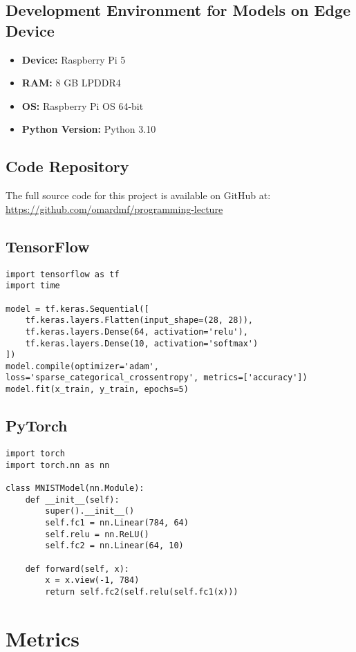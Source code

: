 \documentclass[a4paper,12pt]{article}
\begin{document}
\subsection*{Development Environment for Models on Edge Device}
\begin{itemize}
    \item \textbf{Device:} Raspberry Pi 5
    \item \textbf{RAM:} 8 GB LPDDR4
    \item \textbf{OS:} Raspberry Pi OS 64-bit
    \item \textbf{Python Version:} Python 3.10
\end{itemize}

\subsection{Code Repository}

The full source code for this project is available on GitHub at:  
\url{https://github.com/omardmf/programming-lecture}

\subsection{TensorFlow}
\begin{lstlisting}
import tensorflow as tf
import time

model = tf.keras.Sequential([
    tf.keras.layers.Flatten(input_shape=(28, 28)),
    tf.keras.layers.Dense(64, activation='relu'),
    tf.keras.layers.Dense(10, activation='softmax')
])
model.compile(optimizer='adam', loss='sparse_categorical_crossentropy', metrics=['accuracy'])
model.fit(x_train, y_train, epochs=5)
\end{lstlisting}

\subsection{PyTorch}
\begin{lstlisting}
import torch
import torch.nn as nn

class MNISTModel(nn.Module):
    def __init__(self):
        super().__init__()
        self.fc1 = nn.Linear(784, 64)
        self.relu = nn.ReLU()
        self.fc2 = nn.Linear(64, 10)

    def forward(self, x):
        x = x.view(-1, 784)
        return self.fc2(self.relu(self.fc1(x)))
\end{lstlisting}
\newpage

\section{Metrics}
\end{document}
